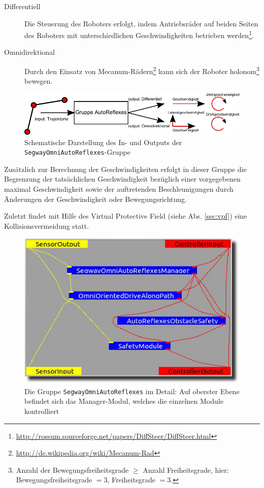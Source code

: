 \begin{description}
	\item[Differentiell] Die Steuerung des Roboters erfolgt, indem Antriebsräder auf beiden Seiten des Roboters mit unterschiedlichen Geschwindigkeiten betrieben werden\footnote{\url{http://rossum.sourceforge.net/papers/DiffSteer/DiffSteer.html}}.
	\item[Omnidirektional] Durch den Einsatz von Mecanum-Rädern\footnote{\url{http://de.wikipedia.org/wiki/Mecanum-Rad}} kann sich der Roboter holonom\footnote{Anzahl der Bewegungsfreiheitsgrade $\geq$ Anzahl Freiheitsgrade, hier: Bewegungsfreiheitsgrade $= 3$, Freiheitsgrade $= 3$.} bewegen.
\end{description}

\begin{figure}[h]
\label{fig:bahnpl_umsetz_schema_inv_kinem}
\centering
\includegraphics[width=\textwidth]{graphics/SCHEMA-invKinem.pdf}
\caption[In- und Output der \lstinline{SegwayOmniAutoReflexes}-Gruppe]{Schematische Darstellung des In- und Outputs der \lstinline{SegwayOmniAutoReflexes}-Gruppe}
\end{figure}

Zusätzlich zur Berechnung der Geschwindigkeiten erfolgt in dieser Gruppe die Begrenzung der tatsächlichen Geschwindigkeit bezüglich einer vorgegebenen maximal Geschwindigkeit sowie der auftretenden Beschleunigungen durch Änderungen der Geschwindigkeit oder Bewegungsrichtung.

Zuletzt findet mit Hilfe des Virtual Protective Field (siehe Abs. \ref{sec:vpf}) eine Kollisionsvermeidung statt.

\begin{figure}[h]
	\label{fig:bahnplanung_umsetzung_auto_refl}
	\center
	\includegraphics[scale=0.8]{graphics/BILD-SegwayOmniAutoReflexes.png}
	\caption[Reflexes-Gruppe im Detail]{Die Gruppe \lstinline{SegwayOmniAutoReflexes} im Detail: Auf oberster Ebene befindet sich das Manager-Modul, welches die einzelnen Module kontrolliert}
\end{figure}

